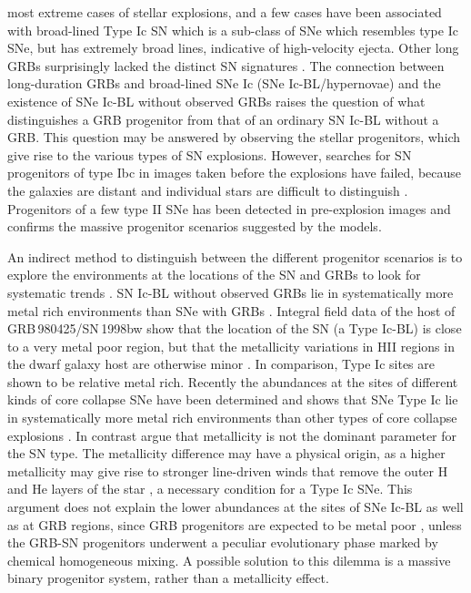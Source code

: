 most
extreme cases of stellar explosions, and a few cases have been associated
with broad-lined Type Ic SN \citep{Woosley2006} which is a sub-class of SNe
which resembles type Ic SNe, but has extremely broad lines, indicative of
high-velocity ejecta. Other long GRBs
  surprisingly lacked the distinct SN
signatures \citep{Fynbo2006}. The connection between long-duration GRBs and
broad-lined SNe Ic (SNe Ic-BL/hypernovae) and the existence of SNe Ic-BL without
observed
GRBs raises the question of what distinguishes a GRB progenitor from
that of an ordinary SN Ic-BL without a GRB. This question may be answered by
observing the stellar progenitors, which give rise to
  the various types of SN
explosions. However, searches for SN
  progenitors of type Ibc in images taken
before the explosions have failed,
  because the galaxies are distant and
individual stars are difficult
  to distinguish \citep{Maund2005}. Progenitors
of a few type II SNe has been detected in pre-explosion images \cite{VanDyk2012}
and confirms the massive progenitor scenarios suggested by the models. 

An indirect method to distinguish between the different progenitor scenarios is
to explore the environments at
the locations of the SN and GRBs to look for
systematic trends \citep{Levesque2014}. SN
Ic-BL without observed GRBs lie in
systematically more metal rich
environments than SNe with GRBs
\citep{Modjaz2008, Graham2013}. Integral field data of the host
of
GRB\,980425/SN\,1998bw show that the location of the SN (a Type
Ic-BL) is close
to a very metal poor region, but that the metallicity
variations in HII regions
in the dwarf galaxy host are otherwise minor
\citep{Christensen2008}.  In
comparison, Type Ic sites are shown to be relative
metal rich. Recently the
abundances at the sites of different kinds of
core collapse SNe have been
determined and shows that SNe Type Ic lie
in systematically more metal rich
environments than other types of
core collapse explosions \citep{Modjaz2011,
Leloudas2011, Kuncarayakti2013a, Kelly2012}.  In contrast \citet{Anderson2010}
argue
that metallicity is not the dominant parameter for the SN type. The
metallicity difference may have a physical origin, as a higher
metallicity may
give rise to stronger line-driven winds that remove
the outer H and He layers of
the star \cite{Vink2005}, a necessary condition for
a Type Ic SNe. This argument
does not explain the lower abundances at
the sites of SNe Ic-BL as well as at
GRB regions, since GRB
progenitors are expected to be metal poor
\citep{Woosley1993}, unless the GRB-SN
progenitors underwent a peculiar
evolutionary phase marked by chemical
homogeneous mixing. A possible solution to
this dilemma is a massive
binary progenitor system, rather than a metallicity
effect.

